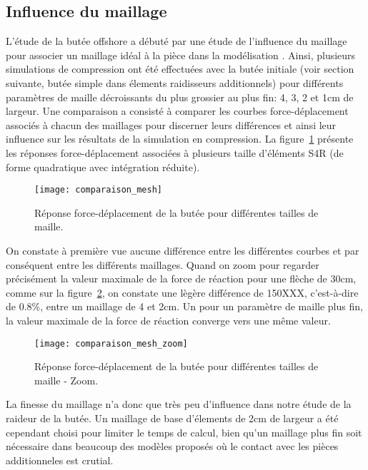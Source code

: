 ﻿\documentclass{article}
\begin{document}
\subsection{Influence du maillage}

L'étude de la butée offshore a débuté par une étude de l'influence du maillage pour associer un maillage idéal à la pièce dans la modélisation \Abaqus. Ainsi, plusieurs simulations de compression ont été effectuées avec la butée initiale (voir section suivante, butée simple dans élements raidisseurs additionnels) pour différents paramètres de maille décroissants du plus grossier au plus fin: 4, 3, 2 et 1cm de largeur.
Une comparaison a consisté à comparer les courbes force-déplacement associés à chacun des maillages pour discerner leurs différences et ainsi leur influence sur les résultats de la simulation en compression. La figure~\ref{fig1} présente les réponses force-déplacement associées à plusieurs taille d'éléments S4R (de forme quadratique avec intégration réduite).

\begin{figure}[!h]
	\centering
	\texttt{[image: comparaison\_mesh]}
	\caption{Réponse force-déplacement de la butée pour différentes tailles de maille.}
	\label{fig1}
\end{figure}


On constate à première vue aucune différence entre les différentes courbes et par conséquent entre les différents maillages. Quand on zoom pour regarder précisément la valeur maximale de la force de réaction pour une flèche de 30cm, comme sur la figure~\ref{fig2}, on constate une lègère différence de 150XXX, c'est-à-dire de 0.8\%, entre un maillage de 4 et 2cm. Un pour un paramètre de maille plus fin, la valeur maximale de la force de réaction converge vers une même valeur.

\begin{figure}[!h]
	\centering
	\texttt{[image: comparaison\_mesh\_zoom]}
	\caption{Réponse force-déplacement de la butée pour différentes tailles de maille - Zoom.}
	\label{fig2}
\end{figure}

La finesse du maillage n'a donc que très peu d'influence dans notre étude de la raideur de la butée. Un maillage de base d'élements de 2cm de largeur a été cependant choisi pour limiter le temps de calcul, bien qu'un maillage plus fin soit nécessaire dans beaucoup des modèles proposés où le contact avec les pièces additionneles est crutial.
\end{document}
